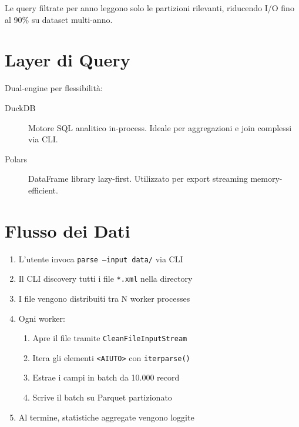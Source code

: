 \begin{tipbox}
Le query filtrate per anno leggono solo le partizioni rilevanti, riducendo I/O fino al 90\% su dataset multi-anno.
\end{tipbox}

\section{Layer di Query}

Dual-engine per flessibilità:

\begin{description}
    \item[DuckDB] Motore SQL analitico in-process. Ideale per aggregazioni e join complessi via CLI.
    \item[Polars] DataFrame library lazy-first. Utilizzato per export streaming memory-efficient.
\end{description}

\section{Flusso dei Dati}

\begin{enumerate}
    \item L'utente invoca \texttt{parse --input data/} via CLI
    \item Il CLI discovery tutti i file \texttt{*.xml} nella directory
    \item I file vengono distribuiti tra N worker processes
    \item Ogni worker:
    \begin{enumerate}
        \item Apre il file tramite \texttt{CleanFileInputStream}
        \item Itera gli elementi \texttt{<AIUTO>} con \texttt{iterparse()}
        \item Estrae i campi in batch da 10.000 record
        \item Scrive il batch su Parquet partizionato
    \end{enumerate}
    \item Al termine, statistiche aggregate vengono loggite
\end{enumerate}
